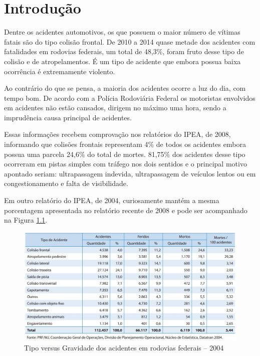 \chapter[Introdução]{Introdução}

Dentre os acidentes automotivos, os que possuem o maior número de vítimas fatais
são do tipo colisão frontal.
De 2010 a 2014 quase metade dos acidentes com
fatalidades em rodovias federais, um total de 48,3\%, foram fruto desse tipo de colisão e de
atropelamentos. É um tipo de acidente que embora possua baixa ocorrência é extremamente violento. \cite{ipea}

	Ao contrário do que se pensa, a maioria dos acidentes ocorre a luz do dia, com tempo bom.
  De acordo com a Polícia Rodoviária Federal os motoristas envolvidos em acidentes não estão
  cansados, dirigem no máximo uma hora, sendo a imprudência causa
  principal de acidentes. \cite{acidentesDeTransitoNoBrasil}

	Essas informações recebem comprovação nos relatórios do IPEA, de 2008, informando que colisões
   frontais representam 4\% de todos os acidentes embora possua uma parcela 24,6\% do total de
   mortes. 81,75\% dos acidentes desse tipo ocorreram em pistas simples com tráfego nos dois
   sentidos e o principal motivo apontado seriam: ultrapassagem indevida, ultrapassagem de
   veículos lentos ou em congestionamento e falta de visibilidade. \cite{fatoresCondicionantesGravidade}

	Em outro relatório do IPEA, de 2004, curiosamente mantém a mesma porcentagem apresentada no
   relatório recente de 2008 e pode ser acompanhado na Figura \ref{fig:introducao}. \cite{custos_acidentes_transito}

   \begin{figure}[h]
     \centering
     \includegraphics[width=450px, scale=0.5]{figuras/introducao}
     \caption{Tipo versus Gravidade dos acidentes em rodovias federais – 2004}
     \label{fig:introducao}
   \end{figure}


